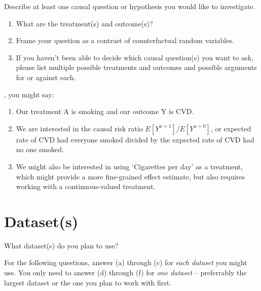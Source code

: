\documentclass[12pt]{article}
\begin{document}
\noindent Describe at least one causal question or hypothesis you would like to investigate. 
\begin{enumerate}[itemsep=0em,label={(\alph*)}]
\item What are the treatment(s) and outcome(s)?
\item Frame your question as a contrast of counterfactual random variables.
\item If you haven't been able to decide which causal question(s) you want to ask, please list multiple possible treatments and outcomes and possible arguments for or against each.
\end{enumerate}

, you might say:
\begin{enumerate}[itemsep=0em,label={(\alph*)}]
\item Our treatment A is smoking and our outcome Y is CVD.
\item We are interested in the causal risk ratio $E[Y^{a=1}] / E[Y^{a=0}]$, or expected rate of CVD had everyone smoked divided by the expected rate of CVD had no one smoked.
\item We might also be interested in using `Cigarettes per day' as a treatment, which might provide a more fine-grained effect estimate, but also requires working with a continuous-valued treatment.
\end{enumerate}

\clearpage

\section{Dataset(s)}

\noindent What dataset(s) do you plan to use?

For the following questions, answer (a) through (c) for \emph{each dataset} you might use. You only need to answer (d) through (f) for \emph{one dataset} -- preferrably the largest dataset or the one you plan to work with first.
\end{document}
